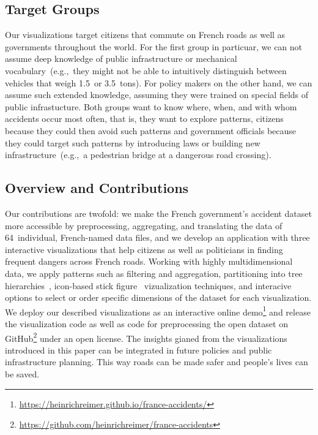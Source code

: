\subsection{Target Groups}
Our visualizations target citizens that commute on French roads as well as governments throughout the world. For the first group in particuar, we can not assume deep knowledge of public infrastructure or mechanical vocabulary~(e.g.,~they might not be able to intuitively distinguish between vehicles that weigh 1.5~or 3.5~tons). For policy makers on the other hand, we can assume such extended knowledge, assuming they were trained on special fields of public infrastucture. Both groups want to know where, when, and with whom accidents occur most often, that is, they want to explore patterns, citizens because they could then avoid such patterns and government officials because they could target such patterns by introducing laws or building new infrastructure~(e.g.,~a pedestrian bridge at a dangerous road crossing). 

\subsection{Overview and Contributions}
Our contributions are twofold: \Ni we make the French government's accident dataset more accessible by preprocessing, aggregating, and translating the data of 64~individual, French-named data files, and \Ni we develop an application with three interactive visualizations that help citizens as well as politicians in finding frequent dangers across French roads.
Working with highly multidimensional data, we apply patterns such as filtering and aggregation, partitioning into tree hierarchies~\cite{Shneiderman1992}, icon-based stick figure~\cite{PickettG1988} vizualization techniques, and interacive options to select or order specific dimensions of the dataset for each visualization.
We deploy our described visualizations as an interactive online demo\footnote{\url{https://heinrichreimer.github.io/france-accidents/}} and release the visualization code as well as code for preprocessing the open dataset on GitHub\footnote{\url{https://github.com/heinrichreimer/france-accidents}} under an open license.
The insights gianed from the visualizations introduced in this paper can be integrated in future policies and public infrastructure planning. This way roads can be made safer and people's lives can be saved.
